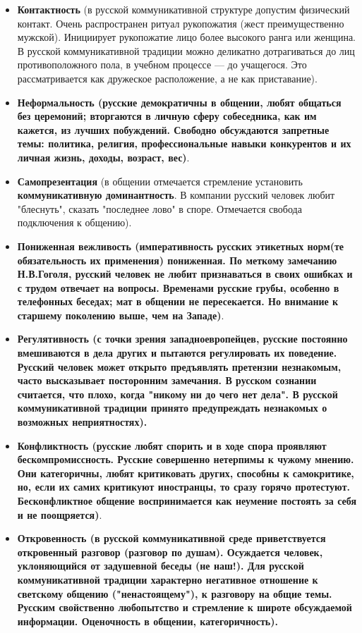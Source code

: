 \begin{itemize}
\item{\bfseries Контактность} (в русской коммуникативной структуре допустим физический контакт. Очень распространен ритуал рукопожатия (жест преимущественно мужской). Инициирует рукопожатие лицо более высокого ранга или женщина. В русской коммуникативной традиции можно деликатно дотрагиваться до лиц противоположного пола, в учебном процессе --- до учащегося. Это рассматривается как дружеское расположение, а не как приставание).
\item {\bfseries
Неформальность \textmd{(русские демократичны в общении, любят общаться без церемоний; вторгаются в личную сферу собеседника, как им кажется, из лучших побуждений. Свободно обсуждаются запретные темы: политика, религия, профессиональные навыки конкурентов и их личная жизнь, доходы, возраст, вес)}}.
\item {\bfseries
Самопрезентация} (в общении отмечается стремление установить {{\bfseries коммуникативную доминантность}. В компании русский человек любит  "блеснуть", сказать  "последнее лово" в споре. Отмечается свобода подключения к общению)}.
\item {\bfseries
Пониженная вежливость \textmd{(императивность русских этикетных норм(те обязательность их применения) пониженная. По меткому замечанию Н.В.Гоголя, русский человек не любит признаваться в своих ошибках и с трудом отвечает на вопросы. Временами русские грубы, особенно в телефонных беседах; мат в общении не пересекается. Но внимание к старшему поколению выше, чем на Западе)}}.
\item {\bfseries
Регулятивность \textmd{(с точки зрения западноевропейцев, русские постоянно вмешиваются в дела других и пытаются регулировать их поведение. Русский человек может открыто предъявлять претензии незнакомым, часто высказывает посторонним замечания. В русском сознании }\textmd{считается, что плохо, когда "никому ни до чего нет дела". В русской коммуникативной традиции принято предупреждать незнакомых о возможных
неприятностях).}}
\item {\bfseries
Конфликтность \textmd{(русские любят спорить и в ходе спора проявляют бескомпромиссность. Русские совершенно нетерпимы к чужому мнению. Они категоричны, любят критиковать других, способны к самокритике, но, если их самих критикуют иностранцы, то сразу горячо протестуют. Бесконфликтное общение воспринимается как неумение постоять за себя и не поощряется)}}.
\item {\bfseries
Откровенность \textmd{(в русской коммуникативной среде приветствуется откровенный разговор (разговор по душам). Осуждается человек, уклоняющийся от задушевной беседы (не наш!). Для русской коммуникативной традиции характерно негативное отношение к светскому общению ("ненастоящему"), к разговору на общие темы. Русским свойственно любопытство и стремление к широте обсуждаемой информации. Оценочность в общении, категоричность).}}

\end{itemize}
